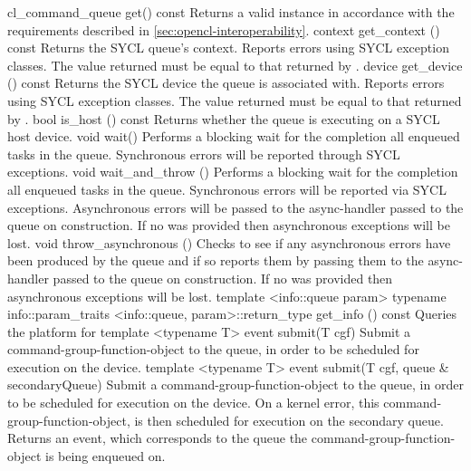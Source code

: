   \addRow
    {cl_command_queue get() const}
    {   
      Returns a valid  instance in accordance with the requirements described in \ref{sec:opencl-interoperability}.    
    }
  \addRow
    {context get_context () const}
    {
      Returns the SYCL queue's context.
      Reports errors using SYCL exception classes.
      The value returned must be equal to that returned by .
    }
  \addRow
    {device get_device () const}
    {
      Returns the SYCL device the queue is associated with.
      Reports errors using SYCL exception classes.
      The value returned must be equal to that returned by .
    }
  \addRow
   {bool is_host () const}
   {
      Returns whether the queue is executing on a SYCL host device.
   }
  \addRow
    {void wait() }
    {
      Performs a blocking wait for the completion all enqueued tasks
      in the queue.  Synchronous errors will be reported through SYCL
      exceptions.
    }
  \addRow
    {void wait_and_throw () }
    {
      Performs a blocking wait for the completion all enqueued tasks
      in the queue.  Synchronous errors will be reported via SYCL
      exceptions. Asynchronous errors will be passed to the
      \gls{async-handler} passed to the queue on
      construction. If no  was provided then
      asynchronous exceptions will be lost.
    }
  \addRow
    {void throw_asynchronous () }
    {
      Checks to see if any asynchronous errors have been produced by
      the queue and if so reports them by passing them to the
      \gls{async-handler} passed to the queue on
      construction. If no  was provided then
      asynchronous exceptions will be lost.
    }
  \addRowFourL
    { template <info::queue param> }
    {  typename info::param_traits}
    {  <info::queue, param>::return_type}
    {  get\_info ()  const}
    {Queries the platform for }
  \addRowTwoL
    {template <typename T>}
    {event submit(T cgf)}
    {Submit a \gls{command-group-function-object} to the queue, in order to be scheduled
    for execution on the device.}
  \addRowThreeL
    {template <typename T>}
    {event submit(T cgf,}
    {             queue \& secondaryQueue)}
    {Submit a \gls{command-group-function-object} to the queue, in order to be scheduled
    for execution on the device. On a kernel error, this \gls{command-group-function-object},
    is then scheduled for execution on the secondary queue. Returns an
    event, which corresponds to the queue the \gls{command-group-function-object}
    is being enqueued on.}
\completeTable

